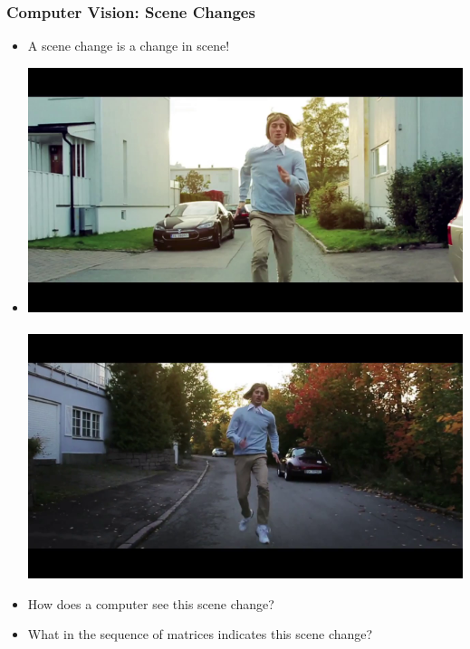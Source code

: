 \documentclass{beamer}
\begin{document}
	
	\begin{frame}
	\frametitle{Computer Vision: Scene Changes}
	
		\begin{itemize}
			\item A scene change is a change in scene!
			
			\item \includegraphics[scale = 0.23]{runningFrame3375} ~~~~ \includegraphics[scale = 0.23]{runningFrame3400}
			
			\pause
			
			\item How does a computer see this scene change?
			
			\pause 
			
			\item What in the sequence of matrices indicates this scene change?
		\end{itemize}
		
		
	\end{frame}
\end{document}
